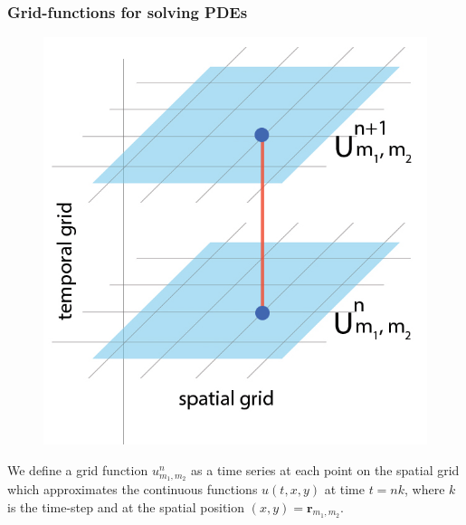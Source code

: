 \documentclass{beamer}
\begin{document}
\begin{frame}
\frametitle{Grid-functions for solving PDEs}

\begin{figure}
\includegraphics[scale=0.2]{./images/jpgGridFunction.jpg}
\label{fig:GridFunctions}
\end{figure}

We define a grid function $u^{n}_{m_1, m_2}$ as a time series at each point on the spatial grid which approximates the continuous functions $u(t,x,y)$ at time $t = nk$, where $k$ is the time-step and at the spatial position $(x,y)=\mathbf{r}_{m_1,m_2}$.

\end{frame}
\end{document}
